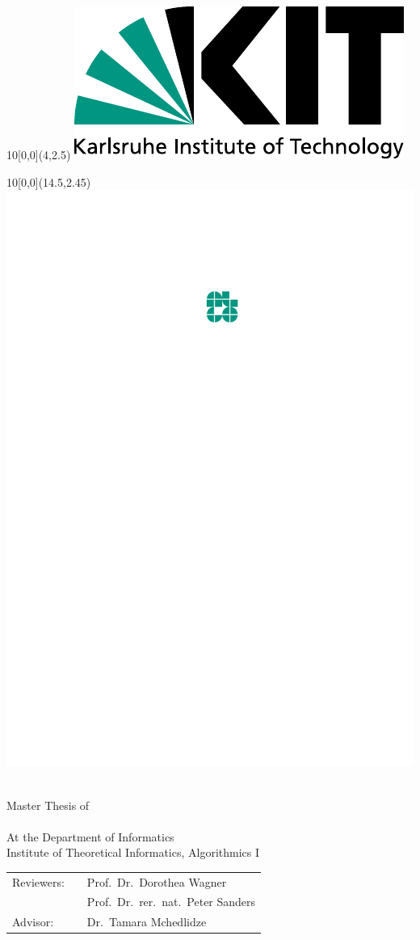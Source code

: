 \makeatletter
\begin{titlepage}


\begin{textblock}{10}[0,0](4,2.5)
\includegraphics[width=.3\textwidth]{Resources/Logos/KIT.pdf}
\end{textblock}

\begin{textblock}{10}[0,0](14.5,2.45)
\includegraphics[width=.15\textwidth]{Resources/Logos/Algo.pdf}
\end{textblock}


\vspace*{3.75cm}

\begin{center}
  \Huge{\@title}
  \vspace*{2.25cm}\\
  \Large{Master Thesis of}\\
  \vspace*{1cm}
  \huge{\@author}\\
  \vspace*{1cm}
  \Large{At the Department of Informatics}\\
  \Large{Institute of Theoretical Informatics, Algorithmics I}\\
\end{center}

\vspace*{1cm}

\begin{center}
\begin{Large}
\begin{tabular}[ht]{l c l}
  Reviewers: & \hfill & Prof.~Dr.~Dorothea Wagner\\
  & \hfill & Prof.~Dr.~rer.~nat.~Peter Sanders\\
  Advisor: & \hfill & Dr.~Tamara Mchedlidze
\end{tabular}
\end{Large}
\end{center}


\end{titlepage}
